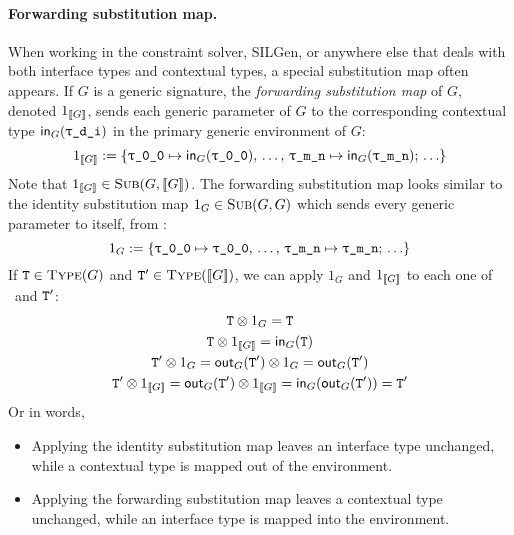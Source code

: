\documentclass[../generics]{subfiles}
\begin{document}
\paragraph{Forwarding substitution map.} When working in the constraint solver, SILGen, or anywhere else that deals with both interface types and contextual types, a special substitution map often appears. If $G$ is a generic signature, the \emph{forwarding substitution map} of $G$, denoted $1_{[\![G]\!]}$, sends each generic parameter  of $G$ to the corresponding contextual type $\MapIn(\ttgp{d}{i})$ in the primary generic environment of $G$:
\[1_{\EquivClass{G}}:=\{\ttgp{0}{0}\mapsto\MapIn(\ttgp{0}{0}),\,\ldots,\,\ttgp{m}{n}\mapsto\MapIn(\ttgp{m}{n});\,\ldots\}\]
Note that $1_{[\![G]\!]}\in\textsc{Sub}({G, [\![G]\!]})$. The forwarding substitution map looks similar to the identity substitution map $1_G\in\textsc{Sub}({G, G})$ which sends every generic parameter to itself, from :
\[1_{G}:=\{\ttgp{0}{0}\mapsto\ttgp{0}{0},\,\ldots,\,\ttgp{m}{n}\mapsto\ttgp{m}{n};\,\ldots\}\]
If $\texttt{T}\in\textsc{Type}({G})$ and $\texttt{T}^\prime\in\textsc{Type}({[\![G]\!]})$, we can apply $1_G$ and $1_{[\![G]\!]}$ to each one of \tT\ and $\texttt{T}^\prime$:
\begin{gather*}
\texttt{T}\otimes 1_G=\texttt{T}\\
\texttt{T}\otimes 1_{[\![G]\!]}=\mathsf{in}_G(\texttt{T})\\
\texttt{T}^\prime\otimes 1_G=\mathsf{out}_G(\texttt{T}^\prime)\otimes 1_G=\mathsf{out}_G(\texttt{T}^\prime)\\
\texttt{T}^\prime\otimes 1_{[\![G]\!]}=\mathsf{out}_G(\texttt{T}^\prime)\otimes 1_{[\![G]\!]}=\mathsf{in}_G(\mathsf{out}_G(\texttt{T}^\prime))=\texttt{T}^\prime
\end{gather*}
Or in words,
\begin{itemize}
\item Applying the identity substitution map leaves an interface type unchanged, while a contextual type is mapped out of the environment.
\item Applying the forwarding substitution map leaves a contextual type unchanged, while an interface type is mapped into the environment.
\end{itemize}
\end{document}
